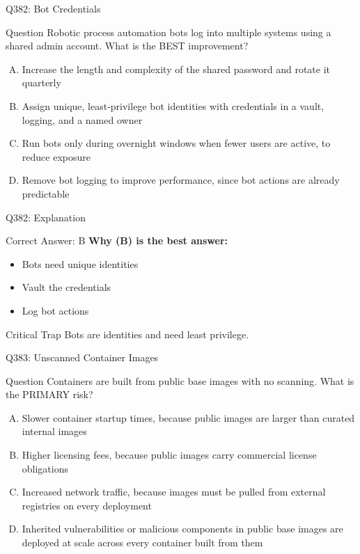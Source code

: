 \documentclass{beamer}
\begin{document}
	\begin{frame}{Q382: Bot Credentials}
		\begin{block}{Question}
			\small Robotic process automation bots log into multiple systems using a shared admin account. What is the BEST improvement?
		\end{block}
		\begin{enumerate}[(A)]
			\footnotesize
			\item Increase the length and complexity of the shared password and rotate it quarterly
			\item Assign unique, least-privilege bot identities with credentials in a vault, logging, and a named owner
			\item Run bots only during overnight windows when fewer users are active, to reduce exposure
			\item Remove bot logging to improve performance, since bot actions are already predictable
		\end{enumerate}
	\end{frame}
	
	\begin{frame}{Q382: Explanation}
		\begin{block}{Correct Answer: B}
			\textbf{Why (B) is the best answer:}
			\begin{itemize}
				\item Bots need unique identities
				\item Vault the credentials
				\item Log bot actions
			\end{itemize}
		\end{block}
		\begin{alertblock}{Critical Trap}
			Bots are identities and need least privilege.
		\end{alertblock}
	\end{frame}
	
	\begin{frame}{Q383: Unscanned Container Images}
		\begin{block}{Question}
			\small Containers are built from public base images with no scanning. What is the PRIMARY risk?
		\end{block}
		\begin{enumerate}[(A)]
			\footnotesize
			\item Slower container startup times, because public images are larger than curated internal images
			\item Higher licensing fees, because public images carry commercial license obligations
			\item Increased network traffic, because images must be pulled from external registries on every deployment
			\item Inherited vulnerabilities or malicious components in public base images are deployed at scale across every container built from them
		\end{enumerate}
	\end{frame}
	
\end{document}
